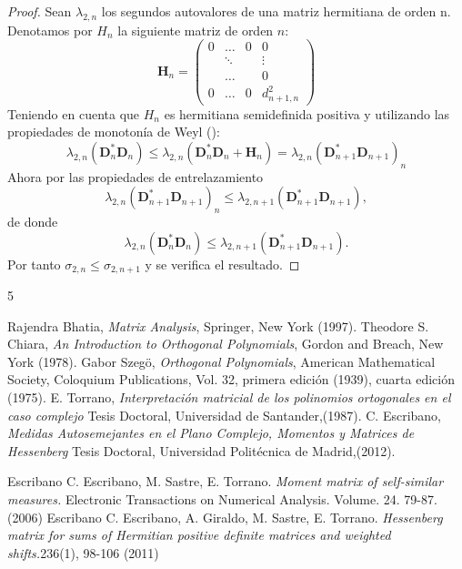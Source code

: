 \documentclass[11pt]{article}
\begin{document}
\begin{proof}
   Sean $\lambda_{2,n}$ los segundos autovalores de una   matriz hermitiana de orden n. Denotamos por $H_n$  la siguiente matriz de orden $n$:
   \[
   \mathbf{H}_n=\begin{pmatrix}
0 & \ldots&0 & 0\\
 & \ddots& & \vdots\\
  & \dots& & 0\\
0 & \dots& 0 & d_{n+1,n}^2

\end{pmatrix}
   \]
   Teniendo en cuenta que $H_n$ es hermitiana semidefinida positiva y utilizando las propiedades de monotonía de Weyl (\cite{Bhatia}):
  \[
  \lambda_{2,n}(\mathbf{D}_n^{*}\mathbf{D}_n) \leq  \lambda_{2,n}(\mathbf{D}_n^{*}\mathbf{D}_n +\mathbf{H}_n)=\lambda_{2,n}(
\mathbf{D}_{n+1}^{*}\mathbf{D}_{n+1})_{n}   \] 
Ahora por las propiedades de entrelazamiento
\[
 \lambda_{2,n}(
\mathbf{D}_{n+1}^{*}\mathbf{D}_{n+1})_{n} \leq \lambda_{2,n+1}(
\mathbf{D}_{n+1}^{*}\mathbf{D}_{n+1}), \] 
de donde 
\[
 \lambda_{2,n}(\mathbf{D}_n^{*}\mathbf{D}_n) \leq \lambda_{2,n+1}(
\mathbf{D}_{n+1}^{*}\mathbf{D}_{n+1}). \] Por tanto $\sigma_{2,n}\leq\sigma_{2,n+1}$  y se verifica el resultado. 
\end{proof}

\bigskip
 

\begin{thebibliography}{5}

Rajendra Bhatia, \textsl{Matrix Analysis}, Springer, New York (1997).
Theodore S. Chiara, \textsl{An Introduction to
Orthogonal Polynomials}, Gordon and Breach, New York (1978).
Gabor Szeg\"{o}, \textsl{Orthogonal Polynomials},
American Mathematical Society, Coloquium Publications, Vol. 32, primera
edici\'{o}n (1939), cuarta edici\'{o}n (1975).
E. Torrano, \textsl{Interpretaci\'on matricial de los
polinomios ortogonales en el caso complejo} Tesis Doctoral, Universidad de Santander,(1987).
C. Escribano, \textsl{Medidas Autosemejantes en el Plano Complejo, Momentos y Matrices de 
 Hessenberg} Tesis Doctoral, Universidad Politécnica de Madrid,(2012).
 
\bibitem[EST06]{} Escribano C. Escribano, M. Sastre, E.  Torrano.\textsl{ Moment matrix of self-similar measures.} Electronic Transactions on Numerical Analysis. Volume. 24. 79-87. (2006)
\bibitem[EGST11]{}
Escribano C. Escribano, A. Giraldo, M. Sastre, E.  Torrano. \textsl{Hessenberg matrix for sums of Hermitian positive definite matrices and
weighted shifts.}236(1), 98-106 (2011)
\end{thebibliography}
\end{document}
